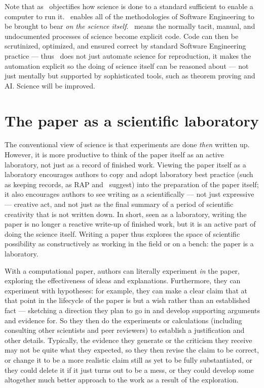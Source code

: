 \documentclass{comjnl}
\begin{document}
Note that as \RAPstar\ objectifies how science is done to a standard sufficient to enable a computer to run it. \RAPstar\ enables all of the methodologies of Software Engineering to be brought to bear \emph{on the science itself}. \RAPstar\ means the normally tacit, manual, and undocumented processes of science become explicit code. Code can then be scrutinized, optimized, and ensured correct by standard Software Engineering practice --- thus \RAPstar\ does not just automate science for reproduction, it makes the automation explicit so the doing of science itself can be reasoned about --- not just mentally but supported by sophisticated tools, such as theorem proving and AI\@. Science will be improved.

\section{The paper as a scientific laboratory}\label{paper-as-lab}
The conventional view of science is that experiments are done \emph{then\/} written up. 
However, it is more productive to think of the paper itself as an active laboratory, not just as a record of finished work. Viewing the paper itself as a laboratory encourages authors to copy and adopt laboratory best practice (such as keeping records, as RAP and \RAPstar\ suggest) into the preparation of the paper itself; it also encourages authors to see writing as a scientifically --- not just expressive --- creative act, and not just as the final summary of a period of scientific creativity that is not written down. In short, seen as a laboratory, writing the paper is no longer a reactive write-up of finished work, but it is an active part of doing the science itself. Writing a paper thus explores the space of scientific possibility as constructively as working in the field or on a bench: the paper is a laboratory.

With a computational paper, authors can literally experiment \emph{in\/} the paper, exploring the effectiveness of ideas and explanations. Furthermore, they can experiment with hypotheses: for example, they can make a clear claim that at that point in the lifecycle of the paper is but a wish rather than an established fact --- sketching a direction they plan to go in and develop supporting arguments and evidence for. So they then do the experiments or calculations (including consulting other scientists and peer reviewers) to establish a justification and other details. Typically, the evidence they generate or the criticism they receive may not be quite what they expected, so they then revise the claim to be correct, or change it to be a more realistic claim still as yet to be fully substantiated, or they could delete it if it just turns out to be a mess, or they could develop some altogether much better approach to the work as a result of the exploration. 
\end{document}
